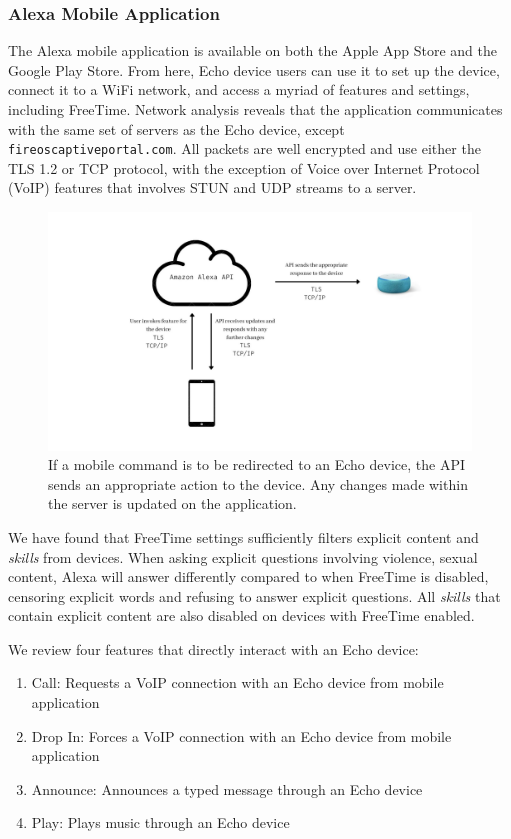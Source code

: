 \documentclass[12pt]{ucthesis}
\begin{document}
\subsubsection{Alexa Mobile Application}
The Alexa mobile application is available on both the Apple App Store and the Google Play Store. From here, Echo device users can use it to set up the device, connect it to a WiFi network, and access a myriad of features and settings, including FreeTime. Network analysis reveals that the application communicates with the same set of servers as the Echo device, except \texttt{fireoscaptiveportal.com}. All packets are well encrypted and use either the TLS 1.2 or TCP protocol, with the exception of Voice over Internet Protocol (VoIP) features that involves STUN and UDP streams to a server.

\begin{figure}
    \includegraphics[width=\textwidth]{mobile command.jpg}
    \caption{If a mobile command is to be redirected to an Echo device, the API sends an appropriate action to the device. Any changes made within the server is updated on the application.}
    \label{fig:mobilecomm}
\end{figure}

We have found that FreeTime settings sufficiently filters explicit content and \textit{skills} from devices. When asking explicit questions involving violence, sexual content, Alexa will answer differently compared to when FreeTime is disabled, censoring explicit words and refusing to answer explicit questions. All \textit{skills} that contain explicit content are also disabled on devices with FreeTime enabled.

We review four features that directly interact with an Echo device:
\begin{enumerate}
\item Call: Requests a VoIP connection with an Echo device from mobile application
\item Drop In: Forces a VoIP connection with an Echo device from mobile application
\item Announce: Announces a typed message through an Echo device
\item Play: Plays music through an Echo device
\end{enumerate}
\end{document}

